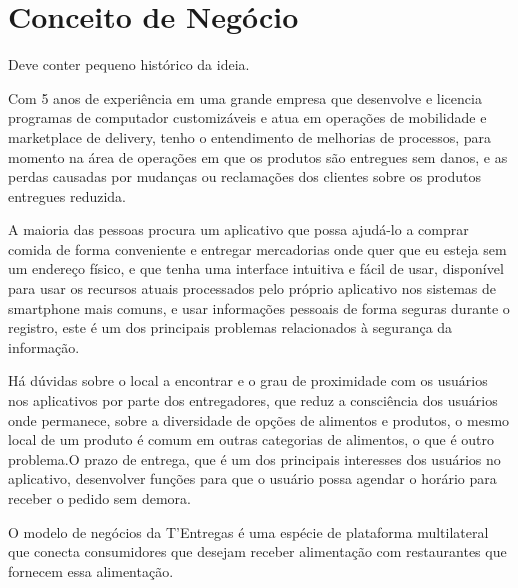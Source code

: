 \chapter{Conceito de Negócio}
\label{chapter:Conceito}


\begin{commentA} \vspace{0.3cm} \noindent Deve conter pequeno histórico da ideia.\par \vspace{0.1cm} \end{commentA}


Com 5 anos de experiência em uma grande empresa que desenvolve e licencia programas de computador customizáveis e atua em operações de mobilidade e marketplace de delivery, tenho o entendimento de melhorias de processos, para momento na área de operações em que os produtos são entregues sem danos, e as perdas causadas por mudanças ou reclamações dos clientes sobre os produtos entregues reduzida.\par

A maioria das pessoas procura um aplicativo que possa ajudá-lo a comprar comida de forma conveniente e entregar mercadorias onde quer que eu esteja sem um endereço físico, e que tenha uma interface intuitiva e fácil de usar, disponível para usar os recursos atuais processados pelo próprio aplicativo nos sistemas de smartphone mais comuns, e usar informações pessoais de forma seguras durante o registro, este é um dos principais problemas relacionados à segurança da informação.\par

Há dúvidas sobre o local a encontrar e o grau de proximidade com os usuários nos aplicativos por parte dos entregadores, que reduz a consciência dos usuários onde permanece, sobre a diversidade de opções de alimentos e produtos, o mesmo local de um produto é comum em outras categorias de alimentos, o que é outro problema.O prazo de entrega, que é um dos principais interesses dos usuários no aplicativo, desenvolver funções para que o usuário possa agendar o horário para receber o pedido sem demora.\par

O modelo de negócios da T'Entregas é uma espécie de plataforma multilateral que conecta consumidores que desejam receber alimentação com restaurantes que fornecem essa alimentação.\par
